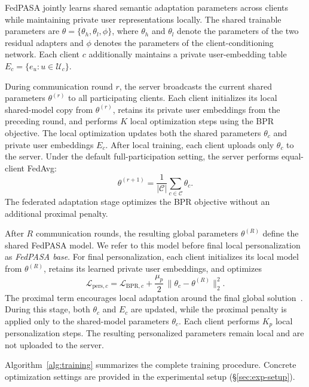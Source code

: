 FedPASA jointly learns shared semantic adaptation parameters across clients while maintaining private user representations locally. The shared trainable parameters are $\theta=\{\theta_h,\theta_l,\phi\}$, where $\theta_h$ and $\theta_l$ denote the parameters of the two residual adapters and $\phi$ denotes the parameters of the client-conditioning network. Each client $c$ additionally maintains a private user-embedding table $E_c=\{e_u:u\in\mathcal{U}_c\}$.

During communication round $r$, the server broadcasts the current shared parameters $\theta^{(r)}$ to all participating clients. Each client initializes its local shared-model copy from $\theta^{(r)}$, retains its private user embeddings from the preceding round, and performs $K$ local optimization steps using the BPR objective. The local optimization updates both the shared parameters $\theta_c$ and private user embeddings $E_c$. After local training, each client uploads only $\theta_c$ to the server. Under the default full-participation setting, the server performs equal-client FedAvg:
\[
\theta^{(r+1)}=\frac{1}{|\mathcal{C}|}\sum_{c\in\mathcal{C}}\theta_c.
\]
The federated adaptation stage optimizes the BPR objective without an additional proximal penalty.

After $R$ communication rounds, the resulting global parameters $\theta^{(R)}$ define the shared FedPASA model. We refer to this model before final local personalization as \emph{FedPASA base}. For final personalization, each client initializes its local model from $\theta^{(R)}$, retains its learned private user embeddings, and optimizes
\[
\mathcal{L}_{\mathrm{pers},c}
=
\mathcal{L}_{\mathrm{BPR},c}
+
\frac{\mu_p}{2}\,\|\theta_c-\theta^{(R)}\|_2^2.
\]
The proximal term encourages local adaptation around the final global solution~\citep{li2020federated,li2021ditto}. During this stage, both $\theta_c$ and $E_c$ are updated, while the proximal penalty is applied only to the shared-model parameters $\theta_c$. Each client performs $K_p$ local personalization steps. The resulting personalized parameters remain local and are not uploaded to the server.

Algorithm~\ref{alg:training} summarizes the complete training procedure. Concrete optimization settings are provided in the experimental setup (\S\ref{sec:exp-setup}).

